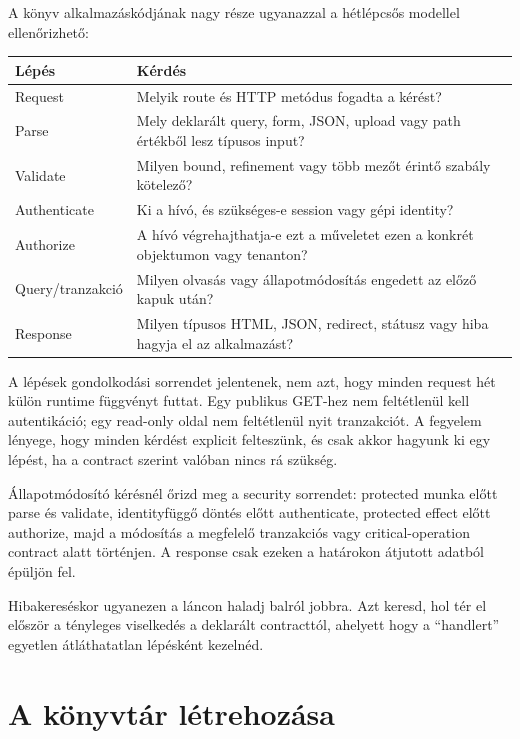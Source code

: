 A könyv alkalmazáskódjának nagy része ugyanazzal a hétlépcsős modellel ellenőrizhető:

\begin{center}
\begin{tabularx}{\textwidth}{@{}lY@{}}
\toprule
Lépés & Kérdés \\
\midrule
Request & Melyik route és HTTP metódus fogadta a kérést? \\
Parse & Mely deklarált query, form, JSON, upload vagy path értékből lesz típusos input? \\
Validate & Milyen bound, refinement vagy több mezőt érintő szabály kötelező? \\
Authenticate & Ki a hívó, és szükséges-e session vagy gépi identity? \\
Authorize & A hívó végrehajthatja-e ezt a műveletet ezen a konkrét objektumon vagy tenanton? \\
Query/tranzakció & Milyen olvasás vagy állapotmódosítás engedett az előző kapuk után? \\
Response & Milyen típusos HTML, JSON, redirect, státusz vagy hiba hagyja el az alkalmazást? \\
\bottomrule
\end{tabularx}
\end{center}

A lépések gondolkodási sorrendet jelentenek, nem azt, hogy minden request hét külön runtime függvényt futtat. Egy publikus GET-hez nem feltétlenül kell autentikáció; egy read-only oldal nem feltétlenül nyit tranzakciót. A fegyelem lényege, hogy minden kérdést explicit felteszünk, és csak akkor hagyunk ki egy lépést, ha a contract szerint valóban nincs rá szükség.

Állapotmódosító kérésnél őrizd meg a security sorrendet: protected munka előtt parse és validate, identityfüggő döntés előtt authenticate, protected effect előtt authorize, majd a módosítás a megfelelő tranzakciós vagy critical-operation contract alatt történjen. A response csak ezeken a határokon átjutott adatból épüljön fel.

Hibakereséskor ugyanezen a láncon haladj balról jobbra. Azt keresd, hol tér el először a tényleges viselkedés a deklarált contracttól, ahelyett hogy a ``handlert'' egyetlen átláthatatlan lépésként kezelnéd.

\section{A könyvtár létrehozása}

